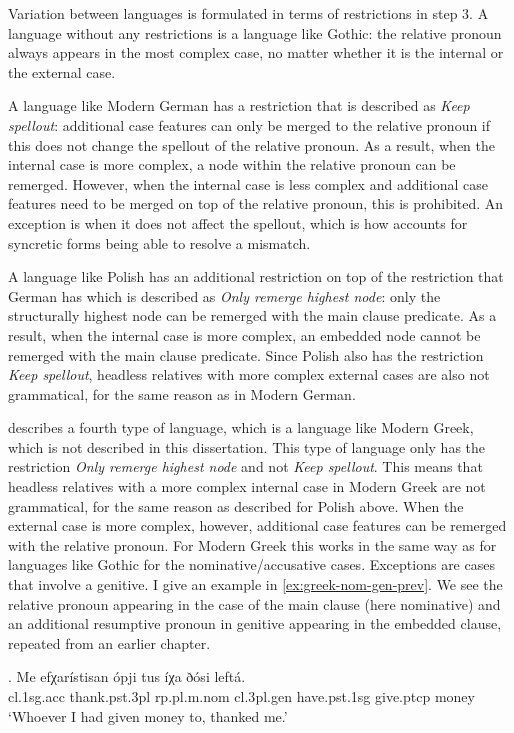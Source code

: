 Variation between languages is formulated in terms of restrictions in step 3. A language without any restrictions is a language like Gothic: the relative pronoun always appears in the most complex case, no matter whether it is the internal or the external case. 

A language like Modern German has a restriction that is described as \textit{Keep spellout}: additional case features can only be merged to the relative pronoun if this does not change the spellout of the relative pronoun. As a result, when the internal case is more complex, a node within the relative pronoun can be remerged. However, when the internal case is less complex and additional case features need to be merged on top of the relative pronoun, this is prohibited. An exception is when it does not affect the spellout, which is how \citet{bergsma2019} accounts for syncretic forms being able to resolve a mismatch. 

A language like Polish has an additional restriction on top of the restriction that German has which is described as \textit{Only remerge highest node}: only the structurally highest node can be remerged with the main clause predicate. As a result, when the internal case is more complex, an embedded node cannot be remerged with the main clause predicate. Since Polish also has the restriction \textit{Keep spellout}, headless relatives with more complex external cases are also not grammatical, for the same reason as in Modern German.

\citet{bergsma2019} describes a fourth type of language, which is a language like Modern Greek, which is not described in this dissertation. This type of language only has the restriction \textit{Only remerge highest node} and not \textit{Keep spellout}. This means that headless relatives with a more complex internal case in Modern Greek are not grammatical, for the same reason as described for Polish above. When the external case is more complex, however, additional case features can be remerged with the relative pronoun. For Modern Greek this works in the same way as for languages like Gothic for the nominative/accusative cases. Exceptions are cases that involve a genitive. I give an example in \ref{ex:greek-nom-gen-prev}. We see the relative pronoun appearing in the case of the main clause (here nominative) and an additional resumptive pronoun in genitive appearing in the embedded clause, repeated from an earlier chapter. 

\exg. Me efχarístisan ópji tus íχa ðósi leftá.\\
 \ac{cl}.1\ac{sg}.\ac{acc} thank.\ac{pst}.3\ac{pl}\scsub{[nom]} \ac{rp}.\ac{pl}.\ac{m}.\ac{nom} \ac{cl}.3\ac{pl}.\ac{gen} have.\ac{pst}.1\ac{sg} give.\ac{ptcp}\scsub{[gen]} money\\
 `Whoever I had given money to, thanked me.'\label{ex:greek-nom-gen-prev}

